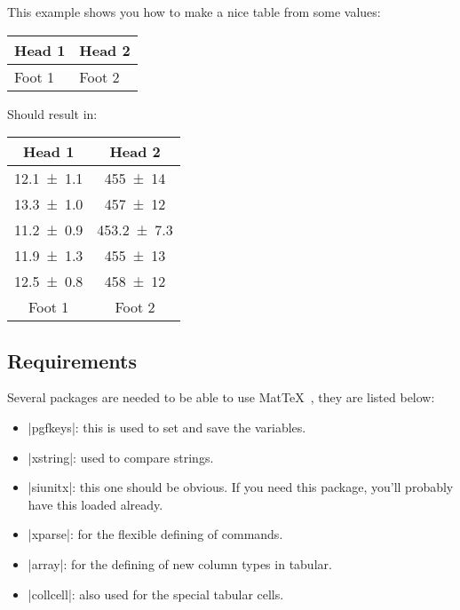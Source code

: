 \documentclass[a4paper,10pt]{article}
\newcommand{\mt}{Mat\TeX\ }
\begin{document}
\newpage
This example shows you how to make a nice table from some values:
\begin{center}
	\begin{texcode}


		\begin{table}[htp]
			\centering
			\begin{tabular}{MM}
				\hline\header
				Head 1 & Head 2 \noheader \\
				\hline
				\usematrix
				\hline \header
				Foot 1 & Foot 2\\
				\hline
			\end{tabular}
		\end{table}
	\end{texcode}
\end{center}
Should result in:
\begin{table}[h]
	\centering
	\begin{tabular}{cc}
	\hline
	Head 1 & Head 2\\
	\hline
	\SI{12.1+-1.1}{} & \SI{455+-14}{}\\
	\SI{13.3+-1.0}{} & \SI{457+-12}{}\\
	\SI{11.2+-0.9}{} & \SI{453.2+-7.3}{}\\
	\SI{11.9+-1.3}{} & \SI{455+-13}{}\\
	\SI{12.5+-0.8}{} & \SI{458+-12}{}\\
	\hline
	Foot 1 & Foot 2\\
	\hline
	\end{tabular}
\end{table}
\vspace{-1cm}



\subsection{Requirements}
Several packages are needed to be able to use \mt, they are listed below:
\begin{itemize}
	\item |pgfkeys|: this is used to set and save the variables.
	\item |xstring|: used to compare strings.
	\item |siunitx|: this one should be obvious. If you need this package, you'll probably have this loaded already.
	\item |xparse|: for the flexible defining of commands.
	\item |array|: for the defining of new column types in tabular.
	\item |collcell|: also used for the special tabular cells.
\end{itemize}
\end{document}
